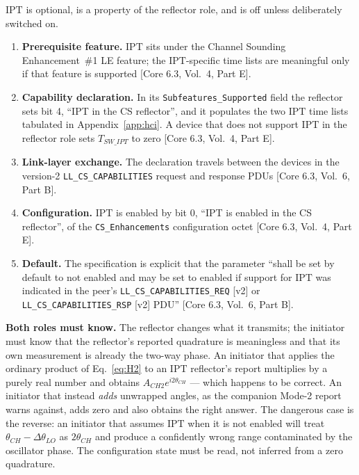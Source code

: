 \documentclass[11pt,a4paper]{article}
\newcommand{\IPT}{\ensuremath{\mathrm{IPT}}}
\newcommand{\Tswipt}{T_{SW\_IPT}}
\newcommand{\code}[1]{\texttt{\small #1}}
\newcommand{\core}[1]{\textcolor{rulegrey}{\small[Core 6.3, #1]}}
\begin{document}
\IPT{} is optional, is a property of the reflector role, and is off unless deliberately switched on.

\begin{enumerate}[leftmargin=1.6em,itemsep=2pt]
  \item \textbf{Prerequisite feature.} \IPT{} sits under the Channel Sounding Enhancement~\#1 LE
    feature; the \IPT-specific time lists are meaningful only if that feature is supported
    \core{Vol.\ 4, Part E}.
  \item \textbf{Capability declaration.} In its \code{Subfeatures\_Supported} field the reflector
    sets bit 4, ``IPT in the CS reflector'', and it populates the two \IPT{} time lists tabulated
    in Appendix~\ref{app:hci}. A device that does not support \IPT{} in the reflector role sets
    $\Tswipt$ to zero \core{Vol.\ 4, Part E}.
  \item \textbf{Link-layer exchange.} The declaration travels between the devices in the version-2
    \code{LL\_CS\_CAPABILITIES} request and response PDUs \core{Vol.\ 6, Part B}.
  \item \textbf{Configuration.} \IPT{} is enabled by bit 0, ``IPT is enabled in the CS reflector'',
    of the \code{CS\_Enhancements} configuration octet \core{Vol.\ 4, Part E}.
  \item \textbf{Default.} The specification is explicit that the parameter ``shall be set by default
    to not enabled and may be set to enabled if support for \IPT{} was indicated in the peer's
    \code{LL\_CS\_CAPABILITIES\_REQ} [v2] or \code{LL\_CS\_CAPABILITIES\_RSP} [v2] PDU''
    \core{Vol.\ 6, Part B}.
\end{enumerate}

\begin{callout}
\textbf{Both roles must know.} The reflector changes what it transmits; the initiator must know that
the reflector's reported quadrature is meaningless and that its own measurement is already the
two-way phase. An initiator that applies the ordinary product of Eq.~\eqref{eq:H2} to an \IPT{}
reflector's report multiplies by a purely real number and obtains $A_{CH2}e^{i2\theta_{CH}}$ ---
which happens to be correct. An initiator that instead \emph{adds} unwrapped angles, as the companion
Mode-2 report warns against, adds zero and also obtains the right answer. The dangerous case is the
reverse: an initiator that assumes \IPT{} when it is not enabled will treat
$\theta_{CH}-\Delta\theta_{LO}$ as $2\theta_{CH}$ and produce a confidently wrong range contaminated
by the oscillator phase. The configuration state must be read, not inferred from a zero quadrature.
\end{callout}
\end{document}
